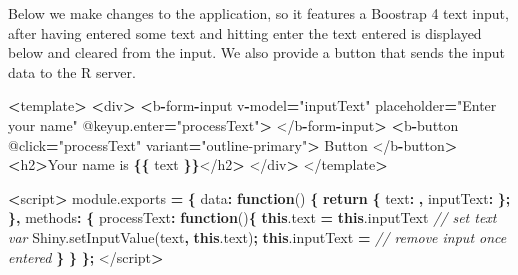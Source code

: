 \documentclass[
  10pt,
]{krantz}
\makeatletter
\newenvironment{Shaded}{\begin{snugshade}}{\end{snugshade}}
\newcommand{\AttributeTok}[1]{\textcolor[rgb]{0.61,0.61,0.61}{#1}}
\newcommand{\CommentTok}[1]{\textcolor[rgb]{0.37,0.37,0.37}{\textit{#1}}}
\newcommand{\ControlFlowTok}[1]{\textcolor[rgb]{0.27,0.27,0.27}{\textbf{#1}}}
\newcommand{\DataTypeTok}[1]{\textcolor[rgb]{0.27,0.27,0.27}{#1}}
\newcommand{\KeywordTok}[1]{\textcolor[rgb]{0.27,0.27,0.27}{\textbf{#1}}}
\newcommand{\NormalTok}[1]{#1}
\newcommand{\OperatorTok}[1]{\textcolor[rgb]{0.43,0.43,0.43}{\textbf{#1}}}
\newcommand{\StringTok}[1]{\textcolor[rgb]{0.5,0.5,0.5}{#1}}
\newcommand{\VariableTok}[1]{\textcolor[rgb]{0,0,0}{#1}}
\newenvironment{kframe}{%
\medskip{}
\setlength{\fboxsep}{.8em}
 \def\at@end@of@kframe{}%
 \ifinner\ifhmode%
  \def\at@end@of@kframe{\end{minipage}}%
  \begin{minipage}{\columnwidth}%
 \fi\fi%
 \def\FrameCommand##1{\hskip\@totalleftmargin \hskip-\fboxsep
 \colorbox{shadecolor}{##1}\hskip-\fboxsep
     \hskip-\linewidth \hskip-\@totalleftmargin \hskip\columnwidth}%
 \MakeFramed {\advance\hsize-\width
   \@totalleftmargin\z@ \linewidth\hsize
   \@setminipage}}%
 {\par\unskip\endMakeFramed%
 \at@end@of@kframe}
\renewenvironment{Shaded}{\begin{kframe}}{\end{kframe}}
\makeatother
\begin{document}
Below we make changes to the application, so it features a Boostrap 4 text input, after having entered some text and hitting enter the text entered is displayed below and cleared from the input. We also provide a button that sends the input data to the R server.

\begin{Shaded}
\begin{Highlighting}[]
\OperatorTok{<}\NormalTok{template}\OperatorTok{>}
  \OperatorTok{<}\NormalTok{div}\OperatorTok{>}
    \OperatorTok{<}\NormalTok{b}\OperatorTok{{-}}\NormalTok{form}\OperatorTok{{-}}\NormalTok{input }
\NormalTok{      v}\OperatorTok{{-}}\NormalTok{model}\OperatorTok{=}\StringTok{"inputText"} 
\NormalTok{      placeholder}\OperatorTok{=}\StringTok{"Enter your name"} 
\NormalTok{      @}\VariableTok{keyup}\NormalTok{.}\AttributeTok{enter}\OperatorTok{=}\StringTok{"processText"}\OperatorTok{>}
\NormalTok{    </b}\OperatorTok{{-}}\NormalTok{form}\OperatorTok{{-}}\NormalTok{input}\OperatorTok{>}
    \OperatorTok{<}\NormalTok{b}\OperatorTok{{-}}\NormalTok{button }
\NormalTok{      @click}\OperatorTok{=}\StringTok{"processText"} 
\NormalTok{      variant}\OperatorTok{=}\StringTok{"outline{-}primary"}\OperatorTok{>}
\NormalTok{      Button}
\NormalTok{    </b}\OperatorTok{{-}}\NormalTok{button}\OperatorTok{>}
    \OperatorTok{<}\NormalTok{h2}\OperatorTok{>}\NormalTok{Your name is }\OperatorTok{\{\{}\NormalTok{ text }\OperatorTok{\}\}}\NormalTok{</h2}\OperatorTok{>}
\NormalTok{  </div}\OperatorTok{>}
\NormalTok{</template}\OperatorTok{>}

\OperatorTok{<}\NormalTok{script}\OperatorTok{>}
\VariableTok{module}\NormalTok{.}\AttributeTok{exports} \OperatorTok{=} \OperatorTok{\{}
  \DataTypeTok{data}\OperatorTok{:} \KeywordTok{function}\NormalTok{() }\OperatorTok{\{}
    \ControlFlowTok{return} \OperatorTok{\{}
      \DataTypeTok{text}\OperatorTok{:} \StringTok{\textquotesingle{}\textquotesingle{}}\OperatorTok{,}
      \DataTypeTok{inputText}\OperatorTok{:} \StringTok{\textquotesingle{}\textquotesingle{}}
    \OperatorTok{\};}
  \OperatorTok{\},}
  \DataTypeTok{methods}\OperatorTok{:} \OperatorTok{\{}
    \DataTypeTok{processText}\OperatorTok{:} \KeywordTok{function}\NormalTok{()}\OperatorTok{\{}
      \KeywordTok{this}\NormalTok{.}\AttributeTok{text} \OperatorTok{=} \KeywordTok{this}\NormalTok{.}\AttributeTok{inputText} \CommentTok{// set text var}
      \VariableTok{Shiny}\NormalTok{.}\AttributeTok{setInputValue}\NormalTok{(}\StringTok{\textquotesingle{}text\textquotesingle{}}\OperatorTok{,} \KeywordTok{this}\NormalTok{.}\AttributeTok{text}\NormalTok{)}\OperatorTok{;}
      \KeywordTok{this}\NormalTok{.}\AttributeTok{inputText} \OperatorTok{=} \StringTok{\textquotesingle{}\textquotesingle{}} \CommentTok{// remove input once entered}
    \OperatorTok{\}}
  \OperatorTok{\}}
\OperatorTok{\};}
\NormalTok{</script}\OperatorTok{>}
\end{Highlighting}
\end{Shaded}
\end{document}

